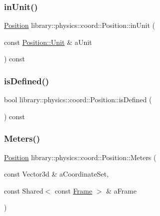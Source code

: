 \mbox{\label{classlibrary_1_1physics_1_1coord_1_1_position_a908878d741ad2de6a2d278d2d674e949}} 
\subsubsection{\texorpdfstring{in\+Unit()}{inUnit()}}
{\footnotesize\ttfamily \hyperlink{classlibrary_1_1physics_1_1coord_1_1_position}{Position} library\+::physics\+::coord\+::\+Position\+::in\+Unit (\begin{DoxyParamCaption}\item[{const \hyperlink{classlibrary_1_1physics_1_1units_1_1_length_a3b8b39cd245cf6b19dc34459baeccb18}{Position\+::\+Unit} \&}]{a\+Unit }\end{DoxyParamCaption}) const}

\mbox{\label{classlibrary_1_1physics_1_1coord_1_1_position_ac13492ffe13b093bb26173089db1a24b}} 
\subsubsection{\texorpdfstring{is\+Defined()}{isDefined()}}
{\footnotesize\ttfamily bool library\+::physics\+::coord\+::\+Position\+::is\+Defined (\begin{DoxyParamCaption}{ }\end{DoxyParamCaption}) const}

\mbox{\label{classlibrary_1_1physics_1_1coord_1_1_position_a9ee5717230be48ee3f52e16383314ba0}} 
\subsubsection{\texorpdfstring{Meters()}{Meters()}}
{\footnotesize\ttfamily \hyperlink{classlibrary_1_1physics_1_1coord_1_1_position}{Position} library\+::physics\+::coord\+::\+Position\+::\+Meters (\begin{DoxyParamCaption}\item[{const Vector3d \&}]{a\+Coordinate\+Set,  }\item[{const Shared$<$ const \hyperlink{classlibrary_1_1physics_1_1coord_1_1_frame}{Frame} $>$ \&}]{a\+Frame }\end{DoxyParamCaption})\hspace{0.3cm}{\ttfamily [static]}}

